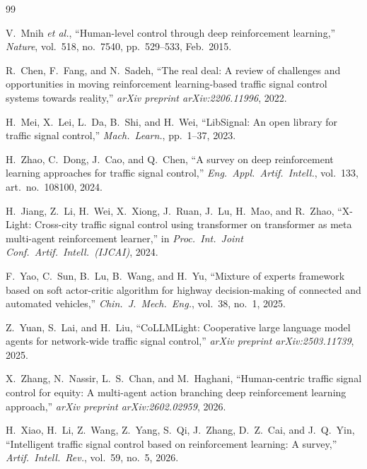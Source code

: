 \documentclass[lettersize,journal]{IEEEtran}
\begin{document}
\begin{thebibliography}{99}

V.~Mnih \textit{et al.},
``Human-level control through deep reinforcement learning,''
\textit{Nature}, vol.~518, no.~7540, pp.~529--533, Feb.\ 2015.

R.~Chen, F.~Fang, and N.~Sadeh,
``The real deal: A review of challenges and opportunities in moving
reinforcement learning-based traffic signal control systems towards
reality,''
\textit{arXiv preprint arXiv:2206.11996}, 2022.

H.~Mei, X.~Lei, L.~Da, B.~Shi, and H.~Wei,
``LibSignal: An open library for traffic signal control,''
\textit{Mach.\ Learn.}, pp.~1--37, 2023.

H.~Zhao, C.~Dong, J.~Cao, and Q.~Chen,
``A survey on deep reinforcement learning approaches for traffic signal
control,''
\textit{Eng.\ Appl.\ Artif.\ Intell.}, vol.~133, art.\ no.~108100, 2024.

H.~Jiang, Z.~Li, H.~Wei, X.~Xiong, J.~Ruan, J.~Lu, H.~Mao, and R.~Zhao,
``X-Light: Cross-city traffic signal control using transformer on
transformer as meta multi-agent reinforcement learner,''
in \textit{Proc.\ Int.\ Joint Conf.\ Artif.\ Intell.\ (IJCAI)}, 2024.

F.~Yao, C.~Sun, B.~Lu, B.~Wang, and H.~Yu,
``Mixture of experts framework based on soft actor-critic algorithm for
highway decision-making of connected and automated vehicles,''
\textit{Chin.\ J.\ Mech.\ Eng.}, vol.~38, no.~1, 2025.

Z.~Yuan, S.~Lai, and H.~Liu,
``CoLLMLight: Cooperative large language model agents for network-wide
traffic signal control,''
\textit{arXiv preprint arXiv:2503.11739}, 2025.

X.~Zhang, N.~Nassir, L.~S.~Chan, and M.~Haghani,
``Human-centric traffic signal control for equity: A multi-agent action
branching deep reinforcement learning approach,''
\textit{arXiv preprint arXiv:2602.02959}, 2026.

H.~Xiao, H.~Li, Z.~Wang, Z.~Yang, S.~Qi, J.~Zhang, D.~Z.~Cai, and J.~Q.~Yin,
``Intelligent traffic signal control based on reinforcement learning: A
survey,''
\textit{Artif.\ Intell.\ Rev.}, vol.~59, no.~5, 2026.


\end{thebibliography}
\end{document}
